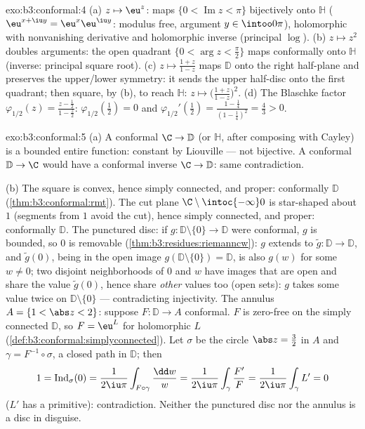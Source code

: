 \begin{solution}{exo:b3:conformal:4}
(a) $z \mapsto \eu^z$: maps $\{0 < \operatorname{Im}z <
\pi\}$ bijectively onto $\mathbb H$ ($\eu^{x+\iu y} =
\eu^x\eu^{\iu y}$: modulus free, argument $y \in
\intoo0\pi$), holomorphic with nonvanishing derivative and
holomorphic inverse (principal $\log$).
(b) $z \mapsto z^2$ doubles arguments: the open quadrant
$\{0 < \arg z < \frac\pi2\}$ maps conformally onto $\mathbb
H$ (inverse: principal square root).
(c) $z \mapsto \frac{1 + z}{1 - z}$ maps $\mathbb D$ onto the
right half-plane and preserves the upper/lower symmetry: it
sends the upper half-disc onto the first quadrant; then
square, by (b), to reach $\mathbb H$: $z \mapsto \bigl(\frac{1
+ z}{1 - z}\bigr)^2$.
(d) The Blaschke factor $\varphi_{1/2}(z) = \frac{z -
\frac12}{1 - \frac z2}$: $\varphi_{1/2}(\tfrac12) = 0$ and
$\varphi_{1/2}'(\tfrac12) = \frac{1 - \frac14}{(1 -
\frac14)^2} = \frac43 > 0$.
\end{solution}

\begin{solution}{exo:b3:conformal:5}
(a) A conformal $\C \to \mathbb D$ (or $\mathbb H$, after
composing with Cayley) is a bounded entire function:
constant by Liouville --- not bijective. A conformal $\mathbb
D \to \C$ would have a conformal inverse $\C \to \mathbb D$:
same contradiction.

(b) The square is convex, hence simply connected, and proper:
conformally $\mathbb D$ (\cref{thm:b3:conformal:rmt}). The cut
plane $\C\setminus\intoc{-\infty}0$ is star-shaped about $1$
(segments from $1$ avoid the cut), hence simply connected,
and proper: conformally $\mathbb D$. The punctured disc: if
$g \colon \mathbb D\setminus\{0\} \to \mathbb D$ were
conformal, $g$ is bounded, so $0$ is removable
(\cref{thm:b3:residues:riemanncw}): $g$ extends to $\tilde g
\colon \mathbb D \to \mathbb D$, and $\tilde g(0)$, being in
the open image $g(\mathbb D\setminus\{0\}) = \mathbb D$, is
also $g(w)$ for some $w \neq 0$; two disjoint neighborhoods
of $0$ and $w$ have images that are open and share the value
$\tilde g(0)$, hence share \emph{other} values too (open
sets): $g$ takes some value twice on
$\mathbb D\setminus\{0\}$ --- contradicting injectivity. The
annulus $A = \{1 < \abs z < 2\}$: suppose $F \colon \mathbb D
\to A$ conformal. $F$ is zero-free on the simply connected
$\mathbb D$, so $F = \eu^L$ for holomorphic $L$
(\cref{def:b3:conformal:simplyconnected}). Let $\sigma$ be
the circle $\abs z = \frac32$ in $A$ and $\gamma =
F^{-1}\circ\sigma$, a closed path in $\mathbb D$; then
\[
1 = \operatorname{Ind}_\sigma(0)
= \frac1{2\iu\pi}\int_{F\circ\gamma}\frac{\dd w}{w}
= \frac1{2\iu\pi}\int_\gamma\frac{F'}{F}
= \frac1{2\iu\pi}\int_\gamma L' = 0
\]
($L'$ has a primitive): contradiction. Neither the punctured
disc nor the annulus is a disc in disguise.
\end{solution}

